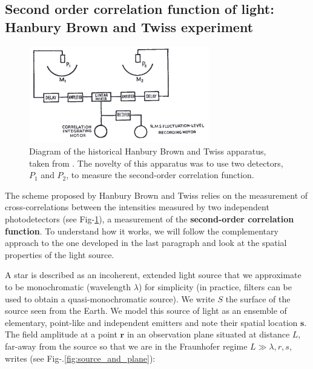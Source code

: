 


\subsection{Second order correlation function of light: Hanbury Brown and Twiss experiment}

\begin{figure}
    \centering
    \includegraphics[width=0.7\textwidth]{Fig/Chapter1/HBT_apparatus.png}
    \caption[Diagram of the historical Hanbury Brown and Twiss apparatus]{Diagram of the historical Hanbury Brown and Twiss apparatus, taken from \cite{brown1956test}. The novelty of this apparatus was to use two detectors, $P_1$ and $P_2$, to measure the second-order correlation function.}
    \label{fig:HBT_apparatus}
\end{figure}

\label{sec:hbt_classical}

The scheme proposed by Hanbury Brown and Twiss relies on the measurement of cross-correlations between the intensities measured by two independent photodetectors (see Fig-\ref{fig:HBT_apparatus}), \ie a measurement of the \textbf{second-order correlation function}. To understand how it works, we will follow the complementary approach to the one developed in the last paragraph and look at the spatial properties of the light source. 

A star is described as an incoherent, extended light source that we approximate to be monochromatic (wavelength $\lambda$) for simplicity (in practice, filters can be used to obtain a quasi-monochromatic source). We write $S$ the surface of the source seen from the Earth. We model this source of light as an ensemble of elementary, point-like and independent emitters and note their spatial location $\bm{s}$. The field amplitude at a point $\bm{r}$ in an observation plane situated at distance $L$, far-away from the source so that we are in the Fraunhofer regime $L \gg \lambda, r,s$, writes (see Fig-.\ref{fig:source_and_plane}):

